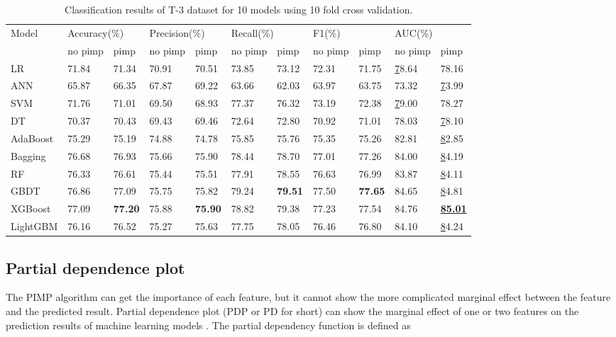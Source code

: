 \documentclass[review]{elsarticle}
\begin{document}
\begin{table}[H]
    \centering
    \caption{Classification results of T-3 dataset for 10 models using 10 fold cross validation.}
    \label{Classification results 3}
    \begin{tabular}{lllllllllll}
    \hline
    \multirow{2}{*}{Model} & \multicolumn{2}{l}{Accuracy(\%)} & \multicolumn{2}{l}{Precision(\%)} & \multicolumn{2}{l}{Recall(\%)} & \multicolumn{2}{l}{F1(\%)} & \multicolumn{2}{l}{AUC(\%)} \\ \cline{2-11}
     & no pimp & pimp & no pimp & pimp & no pimp & pimp & no pimp & pimp & no pimp & pimp \\ \hline
    LR & 71.84 & 71.34 & 70.91 & 70.51 & 73.85 & 73.12 & 72.31 & 71.75 & {\ul 78.64} & 78.16 \\
    ANN & 65.87 & 66.35 & 67.87 & 69.22 & 63.66 & 62.03 & 63.97 & 63.75 & 73.32 & {\ul 73.99} \\
    SVM & 71.76 & 71.01 & 69.50 & 68.93 & 77.37 & 76.32 & 73.19 & 72.38 & {\ul 79.00} & 78.27 \\
    DT & 70.37 & 70.43 & 69.43 & 69.46 & 72.64 & 72.80 & 70.92 & 71.01 & 78.03 & {\ul 78.10} \\
    AdaBoost & 75.29 & 75.19 & 74.88 & 74.78 & 75.85 & 75.76 & 75.35 & 75.26 & 82.81 & {\ul 82.85} \\
    Bagging & 76.68 & 76.93 & 75.66 & 75.90 & 78.44 & 78.70 & 77.01 & 77.26 & 84.00 & {\ul 84.19} \\
    RF & 76.33 & 76.61 & 75.44 & 75.51 & 77.91 & 78.55 & 76.63 & 76.99 & 83.87 & {\ul 84.11} \\
    GBDT & 76.86 & 77.09 & 75.75 & 75.82 & 79.24 & \textbf{79.51} & 77.50 & \textbf{77.65} & 84.65 & {\ul 84.81} \\
    XGBoost & 77.09 & \textbf{77.20} & 75.88 & \textbf{75.90} & 78.82 & 79.38 & 77.23 & 77.54 & 84.76 & {\ul \textbf{85.01}} \\
    LightGBM & 76.16 & 76.52 & 75.27 & 75.63 & 77.75 & 78.05 & 76.46 & 76.80 & 84.10 & {\ul 84.24} \\ \hline
    \end{tabular}
\end{table}

\subsection{Partial dependence plot}
The PIMP algorithm can get the importance of each feature, but it cannot show the more complicated marginal effect between the feature and the predicted result. Partial dependence plot (PDP or PD for short) can show the marginal effect of one or two features on the prediction results of machine learning models \citep{Hastie2009}. The partial dependency function is defined as
\end{document}
